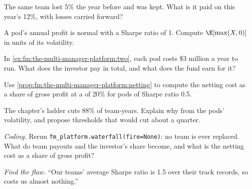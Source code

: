 \begin{exercise}[$\star$]\label{exo:fm:the-multi-manager-platform:2}
The same team lost 5\% the year before and was kept. What is it paid on this year's 12\%, with losses carried forward?
\end{exercise}

\begin{exercise}[$\star$]\label{exo:fm:the-multi-manager-platform:3}
A pod's annual profit is normal with a Sharpe ratio of 1. Compute $\E[\max(X,0)]$ in units of its volatility.
\end{exercise}

\begin{exercise}[$\star\star$]\label{exo:fm:the-multi-manager-platform:4}
In \cref{ex:fm:the-multi-manager-platform:two}, each pod costs \$3 million a year to run. What does the investor pay in total, and what does the
fund earn for it?
\end{exercise}

\begin{exercise}[$\star\star$]\label{exo:fm:the-multi-manager-platform:5}
Use \cref{prop:fm:the-multi-manager-platform:netting} to compute the netting cost as a share of gross profit at a  of 20\% for pods of
Sharpe ratio 0.5.
\end{exercise}

\begin{exercise}[$\star\star$]\label{exo:fm:the-multi-manager-platform:6}
The chapter's ladder cuts 88\% of team-years. Explain why from the pods' volatility, and propose thresholds that would cut about a quarter.
\end{exercise}

\begin{exercise}[$\star\star\star$]\label{exo:fm:the-multi-manager-platform:7}
\emph{Coding.} Rerun \texttt{fm\_platform.waterfall(fire=None)}: no team is ever replaced. What do team payouts and the investor's share become,
and what is the netting cost as a share of gross profit?
\end{exercise}

\begin{exercise}[$\star\star\star$]\label{exo:fm:the-multi-manager-platform:8}
\emph{Find the flaw.} ``Our teams' average Sharpe ratio is 1.5 over their track records, so  costs us almost nothing.''
\end{exercise}

